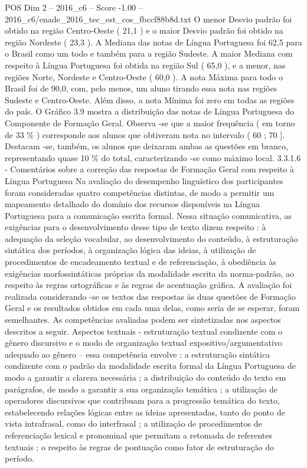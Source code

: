 \begin{textsample}{POS Dim 2 – 2016\_c6 – Score -1.00 – 2016\_c6/enade\_2016\_tec\_est\_cos\_fbccf88b8d.txt}
O menor Desvio padrão foi obtido na região Centro-Oeste ( 21,1 ) e o maior Desvio padrão foi obtido na região Nordeste ( 23,3 ).
A Mediana das notas de Língua Portuguesa foi 62,5 para o Brasil como um todo e também para a região Sudeste.
A maior Mediana com respeito à Língua Portuguesa foi obtida na região Sul ( 65,0 ), e a menor, nas regiões Norte, Nordeste e Centro-Oeste ( 60,0 ).
A nota Máxima para todo o Brasil foi de 90,0, com, pelo menos, um aluno tirando essa nota nas regiões Sudeste e Centro-Oeste.
Além disso, a nota Mínima foi zero em todas as regiões do país.
O Gráfico 3.9 mostra a distribuição das notas de Língua Portuguesa do Componente de Formação Geral.
Observa -se que a maior frequência ( em torno de 33 \% ) corresponde aos alunos que obtiveram nota no intervalo ( 60 ; 70 ].
Destacam -se, também, os alunos que deixaram ambas as questões em branco, representando quase 10 \% do total, caracterizando -se como máximo local. 3.3.1.6 - Comentários sobre a correção das respostas de Formação Geral com respeito à Língua Portuguesa Na avaliação do desempenho linguístico dos participantes foram consideradas quatro competências distintas, de modo a permitir um mapeamento detalhado do domínio dos recursos disponíveis na Língua Portuguesa para a comunicação escrita formal.
Nessa situação comunicativa, as exigências para o desenvolvimento desse tipo de texto dizem respeito : à adequação da seleção vocabular, ao desenvolvimento do conteúdo, à estruturação sintática dos períodos, à organização lógica das ideias, à utilização de procedimentos de encadeamento textual e de referenciação, à obediência às exigências morfossintáticas próprias da modalidade escrita da norma-padrão, ao respeito às regras ortográficas e às regras de acentuação gráfica.
A avaliação foi realizada considerando -se os textos das respostas às duas questões de Formação Geral e os resultados obtidos em cada uma delas, como seria de se esperar, foram semelhantes.
As competências avaliadas podem ser sintetizadas nos aspectos descritos a seguir.
Aspectos textuais - estruturação textual condizente com o gênero discursivo e o modo de organização textual expositivo/argumentativo adequado ao gênero – essa competência envolve : a estruturação sintática condizente com o padrão da modalidade escrita formal da Língua Portuguesa de modo a garantir a clareza necessária ; a distribuição do conteúdo do texto em parágrafos, de modo a garantir a sua organização temática ; a utilização de operadores discursivos que contribuam para a progressão temática do texto, estabelecendo relações lógicas entre as ideias apresentadas, tanto do ponto de vista intrafrasal, como do interfrasal ; a utilização de procedimentos de referenciação lexical e pronominal que permitam a retomada de referentes textuais ; o respeito às regras de pontuação como fator de estruturação do período.

\end{textsample}
